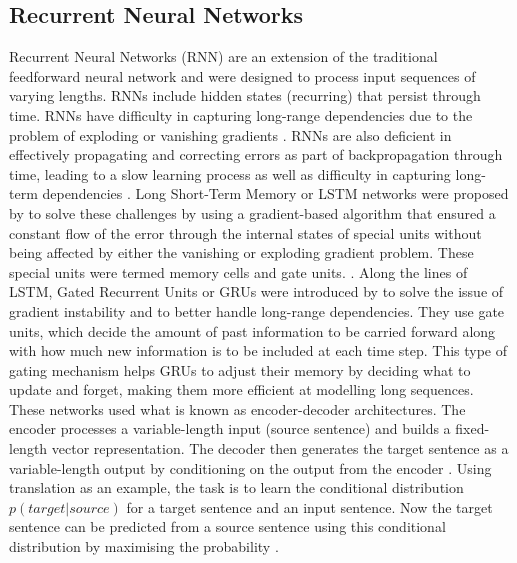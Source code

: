 \subsection{Recurrent Neural Networks}
Recurrent Neural Networks (RNN) are an extension of the traditional feedforward neural network and were designed to process input sequences of varying lengths. RNNs include hidden states (recurring) that persist through time. RNNs have difficulty in capturing long-range dependencies due to the problem of exploding or vanishing gradients \cite{chungEmpiricalEvaluationGated2014}. RNNs are also deficient in effectively propagating and correcting errors as part of backpropagation through time, leading to a slow learning process as well as difficulty in capturing long-term dependencies \cite{chungEmpiricalEvaluationGated2014}. Long Short-Term Memory or LSTM networks were proposed by \cite{chungEmpiricalEvaluationGated2014} to solve these challenges by using a gradient-based algorithm that ensured a constant flow of the error through the internal states of special units without being affected by either the vanishing or exploding gradient problem. These special units were termed memory cells and gate units. \cite{hochreiterLongShortTermMemory1997}. Along the lines of LSTM, Gated Recurrent Units or GRUs were introduced by \cite{choPropertiesNeuralMachine2014} to solve the issue of gradient instability and to better handle long-range dependencies. They use gate units, which decide the amount of past information to be carried forward along with how much new information is to be included at each time step. This type of gating mechanism helps GRUs to adjust their memory by deciding what to update and forget, making them more efficient at modelling long sequences.\\

These networks used what is known as encoder-decoder architectures. The encoder processes a variable-length input (source sentence) and builds a ﬁxed-length vector representation. The decoder then generates the target sentence as a variable-length output by conditioning on the output from the encoder \cite{choPropertiesNeuralMachine2014}. Using translation as an example, the task is to learn the conditional distribution $p(target | source)$ for a target sentence and an input sentence. Now the target sentence can be predicted from a source sentence using this conditional distribution by maximising the probability \cite{choPropertiesNeuralMachine2014}.\\

